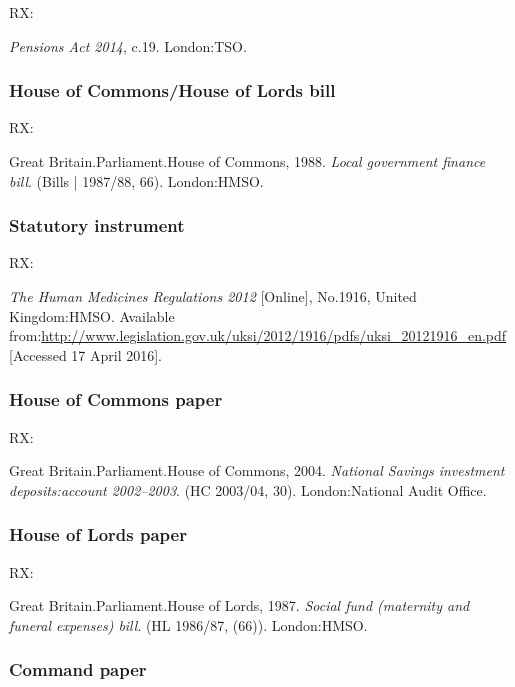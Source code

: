 RX: \cite{gb.pa2014}

\emph{Pensions Act 2014}, c.19. London:\@ TSO.



\subsubsection*{House of Commons/House of Lords bill}

RX: \cite{gb.bill1987/88-66}

Great Britain.\@ Parliament.\@ House of Commons, 1988. \emph{Local government finance bill}. (Bills | 1987/88, 66). London:\@ HMSO.




\subsubsection*{Statutory instrument}

RX: \cite{gb.hmr2012}

\emph{The Human Medicines Regulations 2012} [Online], No.1916, United Kingdom:\@ HMSO. Available from:\@ \url{http://www.legislation.gov.uk/uksi/2012/1916/pdfs/uksi_20121916_en.pdf} [Accessed 17 April 2016].




\subsubsection*{House of Commons paper}

RX: \cite{gb.hc2003/04-30}

Great Britain.\@ Parliament.\@ House of Commons, 2004. \emph{National Savings investment deposits:\@ account 2002--2003}. (HC 2003/04, 30). London:\@ National Audit Office.



\subsubsection*{House of Lords paper}

RX: \cite{gb.hl1986/87-66}

Great Britain.\@ Parliament.\@ House of Lords, 1987. \emph{Social fund (maternity and funeral expenses) bill}. (HL 1986/87, (66)). London:\@ HMSO.



\subsubsection*{Command paper}

